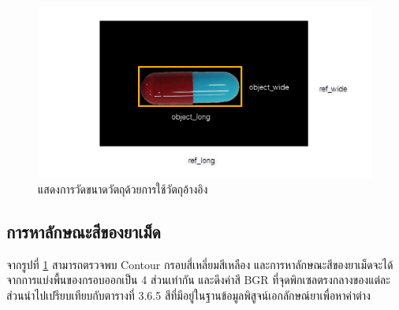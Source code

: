 		\begin{figure}[H]
			\includegraphics[width=\columnwidth]{Figures/3/opencv3}
			\caption{แสดงการวัดขนาดวัตถุด้วยการใช้วัตถุอ้างอิง}
			\label{Fig:opencv3}
		\end{figure}
		

	\subsection{การหาลักษณะสีของยาเม็ด}
		จากรูปที่ \ref{Fig:opencv3} สามารถตรวจพบ Contour กรอบสี่เหลี่ยมสีเหลือง และการหาลักษณะสีของยาเม็ดจะได้จากการแบ่งพื้นของกรอบออกเป็น 4 ส่วนเท่ากัน และดึงค่าสี BGR ที่จุดพิกเซลตรงกลางของแต่ละส่วนนำไปเปรียบเทียบกับตารางที่ 3.6.5 สีที่มีอยู่ในฐานข้อมูลพิสูจน์เอกลักษณ์ยาเพื่อหาค่าต่าง
		
